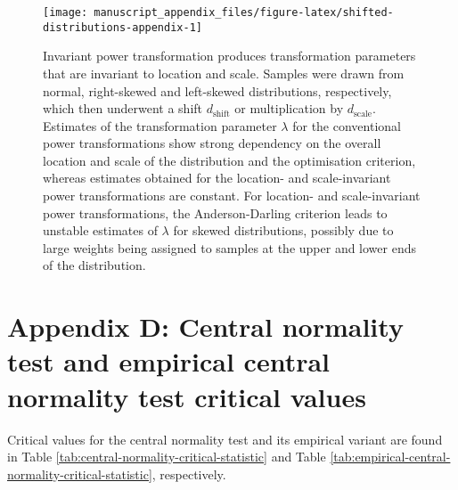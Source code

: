 \documentclass[
  a4paper,
]{article}
\begin{document}
\begin{figure}

{\centering \texttt{[image: manuscript\_appendix\_files/figure-latex/shifted-distributions-appendix-1]} 

}

\caption{Invariant power transformation produces transformation parameters that are invariant to location and scale. Samples were drawn from normal, right-skewed and left-skewed distributions, respectively, which then underwent a shift $d_{\text{shift}}$ or multiplication by $d_{\text{scale}}$. Estimates of the transformation parameter $\lambda$ for the conventional power transformations show strong dependency on the overall location and scale of the distribution and the optimisation criterion, whereas estimates obtained for the location- and scale-invariant power transformations are constant. For location- and scale-invariant power transformations, the Anderson-Darling criterion leads to unstable estimates of $\lambda$ for skewed distributions, possibly due to large weights being assigned to samples at the upper and lower ends of the distribution.}\label{fig:shifted-distributions-appendix}
\end{figure}

\section{Appendix D: Central normality test and empirical central
normality test critical
values}\label{appendix-d-central-normality-test-and-empirical-central-normality-test-critical-values}

Critical values for the central normality test and its empirical variant
are found in Table \ref{tab:central-normality-critical-statistic} and
Table \ref{tab:empirical-central-normality-critical-statistic},
respectively.
\end{document}
